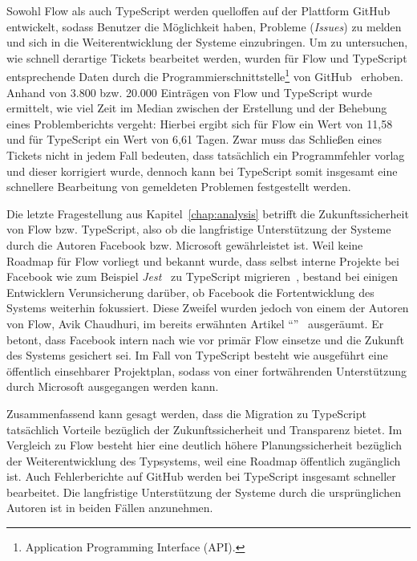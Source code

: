 Sowohl Flow als auch TypeScript werden quelloffen auf der Plattform GitHub entwickelt, sodass Benutzer die Möglichkeit haben, Probleme (\textit{Issues}) zu melden und sich in die Weiterentwicklung der Systeme einzubringen. Um zu untersuchen, wie schnell derartige Tickets bearbeitet werden, wurden für Flow und TypeScript entsprechende Daten durch die Programmierschnittstelle\footnote{Application Programming Interface (API).} von GitHub~\autocite{GITHUB:API} erhoben. Anhand von 3.800 bzw. 20.000 Einträgen von Flow und TypeScript wurde ermittelt, wie viel Zeit im Median zwischen der Erstellung und der Behebung eines Problemberichts vergeht: Hierbei ergibt sich für Flow ein Wert von 11,58 und für TypeScript ein Wert von 6,61 Tagen. Zwar muss das Schließen eines Tickets nicht in jedem Fall bedeuten, dass tatsächlich ein Programmfehler vorlag und dieser korrigiert wurde, dennoch kann bei TypeScript somit insgesamt eine schnellere Bearbeitung von gemeldeten Problemen festgestellt werden.

Die letzte Fragestellung aus Kapitel~\ref{chap:analysis} betrifft die Zukunftssicherheit von Flow bzw. TypeScript, also ob die langfristige Unterstützung der Systeme durch die Autoren Facebook bzw. Microsoft gewährleistet ist. Weil keine Roadmap für Flow vorliegt und bekannt wurde, dass selbst interne Projekte bei Facebook wie zum Beispiel \textit{Jest}~\autocite{SOFTWARE:JEST} zu TypeScript migrieren~\autocite{JEST_TS}, bestand bei einigen Entwicklern Verunsicherung darüber, ob Facebook die Fortentwicklung des Systems weiterhin fokussiert. Diese Zweifel wurden jedoch von einem der Autoren von Flow, Avik Chaudhuri, im bereits erwähnten Artikel \enquote{}~\autocite{FLOW:UPDATE_2019} ausgeräumt. Er betont, dass Facebook intern nach wie vor primär Flow einsetze und die Zukunft des Systems gesichert sei. Im Fall von TypeScript besteht wie ausgeführt eine öffentlich einsehbarer Projektplan, sodass von einer fortwährenden Unterstützung durch Microsoft ausgegangen werden kann.

Zusammenfassend kann gesagt werden, dass die Migration zu TypeScript tatsächlich Vorteile bezüglich der Zukunftssicherheit und Transparenz bietet. Im Vergleich zu Flow besteht hier eine deutlich höhere Planungssicherheit bezüglich der Weiterentwicklung des Typsystems, weil eine Roadmap öffentlich zugänglich ist. Auch Fehlerberichte auf GitHub werden bei TypeScript insgesamt schneller bearbeitet. Die langfristige Unterstützung der Systeme durch die ursprünglichen Autoren ist in beiden Fällen anzunehmen.

